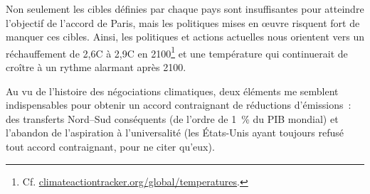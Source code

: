 \documentclass[a5paper,french,openany]{memoir}
\begin{document}
Non seulement les cibles définies par chaque pays sont insuffisantes pour atteindre l'objectif de l'accord de Paris, mais les politiques mises en œuvre risquent fort de manquer ces cibles. Ainsi, les politiques et actions 
actuelles nous orientent vers un réchauffement de 2,6\textdegree{}C à 2,9\textdegree{}C en 2100\footnote{Cf. \href{https://climateactiontracker.org/global/temperatures/}{climateactiontracker.org/global/temperatures}.} et une température qui continuerait de croître à un rythme alarmant après 2100. 

Au vu de l'histoire des négociations climatiques, deux éléments me semblent indispensables pour obtenir un accord contraignant de réductions d'émissions~: des transferts Nord--Sud conséquents (de l'ordre de 1~\% du PIB mondial) et l'abandon de l'aspiration à l'universalité (les États-Unis ayant toujours refusé tout accord contraignant, pour ne citer qu'eux).
\end{document}
